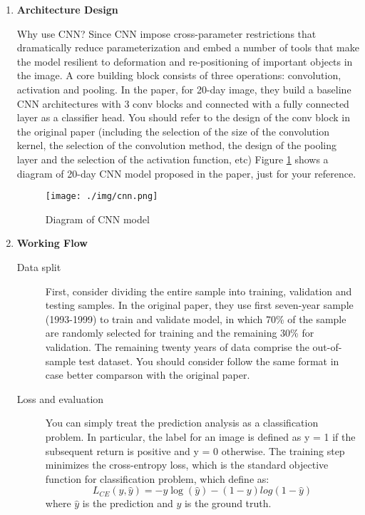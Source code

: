 \documentclass[11pt]{article}
\begin{document}
\begin{enumerate}
    \item \textbf{Architecture Design}
    
    Why use CNN? Since CNN impose cross-parameter restrictions that dramatically reduce parameterization and embed a number of tools that make the model resilient to deformation and re-positioning of important objects in the image. A core building block consists of three operations: convolution, activation and pooling. In the paper, for 20-day image, they build a baseline CNN architectures with 3 conv blocks and connected with a fully connected layer as a classifier head. You should refer to the design of the conv block in the original paper (including the selection of the size of the convolution kernel, the selection of the convolution method, the design of the pooling layer and the selection of the activation function, etc) Figure \ref{cnn model} shows a diagram of 20-day CNN model proposed in the paper, just for your reference.
    
    \begin{figure}
        \centering
        \texttt{[image: ./img/cnn.png]}
        \caption{Diagram of CNN model}
        \label{cnn model}
    \end{figure}
    
    \item \textbf{Working Flow}
    
    \begin{description}
    \item[Data split] First, consider dividing the entire sample into training, validation and testing samples. In the original paper, they use first seven-year sample (1993-1999) to train and validate model, in which 70\% of the sample are randomly selected for training and the remaining 30\% for validation. The remaining twenty years of data  comprise the out-of-sample test dataset. You should consider follow the same format in case better comparson with the original paper.
    
    \item[Loss and evaluation] You can simply treat the prediction analysis as a classification problem. In particular, the label for an image is defined as y = 1 if the subsequent return is positive and y = 0 otherwise. The training step minimizes the cross-entropy loss, which is the standard objective function for classification problem, which define as:$$L_{CE}(y,\hat{y}) = -y\log(\hat{y}) - (1-y)log(1-\hat{y})$$ where $\hat{y}$ is the prediction and $y$ is the ground truth. 
    

\end{description}
\end{enumerate}
\end{document}
